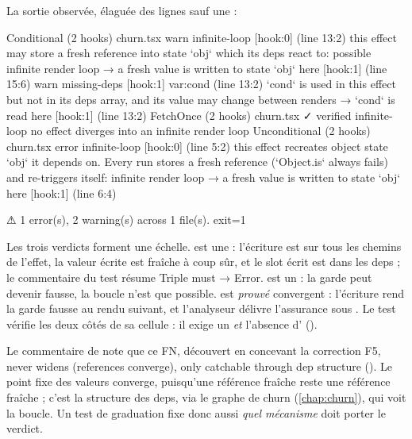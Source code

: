 La sortie observée, élaguée des lignes  sauf une :

\begin{sortie}
  Conditional  (2 hooks)  churn.tsx
    warn   infinite-loop  [hook:0]  (line 13:2)  this effect may store a fresh reference into state `obj` which its deps react to: possible infinite render loop
       → a fresh value is written to state `obj` here [hook:1] (line 15:6)
    warn   missing-deps  [hook:1]  var:cond  (line 13:2)  `cond` is used in this effect but not in its deps array, and its value may change between renders
       → `cond` is read here [hook:1] (line 13:2)
  FetchOnce  (2 hooks)  churn.tsx  ✓
    verified  infinite-loop  no effect diverges into an infinite render loop
  Unconditional  (2 hooks)  churn.tsx
    error  infinite-loop  [hook:0]  (line 5:2)  this effect recreates object state `obj` it depends on. Every run stores a fresh reference (`Object.is` always fails) and re-triggers itself: infinite render loop
       → a fresh value is written to state `obj` here [hook:1] (line 6:4)

⚠  1 error(s), 2 warning(s) across 1 file(s).
exit=1
\end{sortie}

Les trois verdicts forment une échelle.  est une \Error{} : l'écriture est sur tous les chemins de l'effet, la valeur écrite est fraîche à coup sûr, et le slot écrit est dans les deps ; le commentaire du test résume \og Triple must → Error\fg{}.  est un \Warning{} : la garde  peut devenir fausse, la boucle n'est que possible.  est \emph{prouvé} convergent : l'écriture rend la garde  fausse au rendu suivant, et l'analyseur délivre l'assurance  sous . Le test  vérifie les deux côtés de sa cellule : il exige un \Warning{} \emph{et} l'absence d'\Error{} ().

\begin{remarque}
Le commentaire de  note que ce FN, découvert en concevant la correction F5, \og never widens (references converge), only catchable through dep structure\fg{} (). Le point fixe des valeurs converge, puisqu'une référence fraîche reste une référence fraîche ; c'est la structure des deps, via le graphe de churn (\cref{chap:churn}), qui voit la boucle. Un test de graduation fixe donc aussi \emph{quel mécanisme} doit porter le verdict.
\end{remarque}

